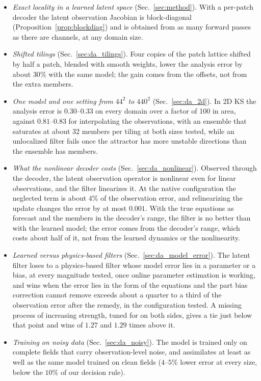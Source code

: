 \begin{itemize}
\item \emph{Exact locality in a learned latent space}
  (Sec.~\ref{sec:method}). With a per-patch decoder the latent observation
  Jacobian is block-diagonal (Proposition~\ref{prop:blockdiag}) and is
  obtained from as many forward passes as there are channels, at any
  domain size.
\item \emph{Shifted tilings} (Sec.~\ref{sec:da_tilings}). Four copies of the
  patch lattice shifted by half a patch, blended with smooth weights, lower
  the analysis error by about $30\%$ with the same model; the gain comes
  from the offsets, not from the extra members.
\item \emph{One model and one setting from $44^2$ to $440^2$}
  (Sec.~\ref{sec:da_2d}). In 2D KS the analysis error is $0.30$--$0.33$ on
  every domain over a factor of 100 in area, against $0.81$--$0.83$ for
  interpolating the observations, with an ensemble that saturates at
  about 32 members per tiling at both sizes tested, while an unlocalized filter
  fails once the attractor has more unstable directions than the ensemble
  has members.
\item \emph{What the nonlinear decoder costs} (Sec.~\ref{sec:da_nonlinear}).
  Observed through the decoder, the latent observation operator is
  nonlinear even for linear observations, and the filter linearizes it. At
  the native configuration the neglected term is about $4\%$ of the
  observation error, and relinearizing the update changes the error by at
  most $0.001$. With the true equations as forecast and the members in the
  decoder's range, the filter is no better than with the learned model; the
  error comes from the decoder's range, which costs about half of it, not
  from the learned dynamics or the nonlinearity.
\item \emph{Learned versus physics-based filters}
  (Sec.~\ref{sec:da_model_error}). The latent filter loses to a
  physics-based filter whose model error lies in a parameter or a bias,
  at every magnitude tested, once online parameter estimation is working, and wins when
  the error lies in the form of the equations and the part bias correction
  cannot remove exceeds about a quarter to a third of the observation error after the remedy,
  in the configuration tested. A missing process of
  increasing strength, tuned for on both sides, gives a tie just below that
  point and wins of $1.27$ and $1.29$ times above it.
\item \emph{Training on noisy data} (Sec.~\ref{sec:da_noisy}). The model is
  trained only on complete fields that carry observation-level noise, and
  assimilates at least as well as the same model trained on clean fields
  ($4$--$5\%$ lower error at every size, below the $10\%$ of our decision rule).
\end{itemize}

